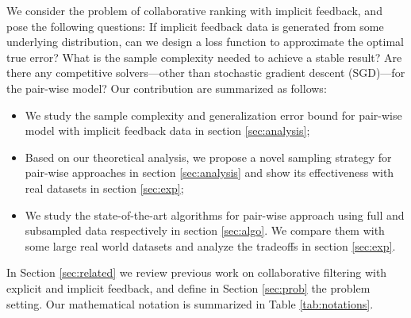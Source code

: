 \documentclass[conference]{IEEEtran}
\numberwithin{equation}{section}
\newtheorem{sampling strategy}{Sampling Strategy}
\begin{document}
We consider the problem of collaborative ranking with implicit feedback, and pose the following questions: If implicit feedback data is generated
from some underlying distribution, can we design a loss function to approximate the optimal true error? What is the sample complexity needed to achieve a stable result? Are there any competitive solvers---other than stochastic gradient descent (SGD)---for the pair-wise model? Our contribution are summarized as follows: 
\begin{itemize}
    \item We study the sample complexity and generalization error bound for pair-wise model with implicit feedback data in section \ref{sec:analysis};
    \item Based on our theoretical analysis, we propose a novel sampling strategy for pair-wise approaches in section \ref{sec:analysis} and show its effectiveness with real datasets in section \ref{sec:exp};
    \item We study the state-of-the-art algorithms for pair-wise approach using full and subsampled data respectively in section \ref{sec:algo}. We compare them with some large real world datasets and analyze the tradeoffs in section \ref{sec:exp}.
\end{itemize}


In Section \ref{sec:related} we review previous work on collaborative filtering with explicit and implicit feedback, and define in Section \ref{sec:prob} the problem setting. 
Our mathematical notation is summarized in Table \ref{tab:notations}.


\end{document}
